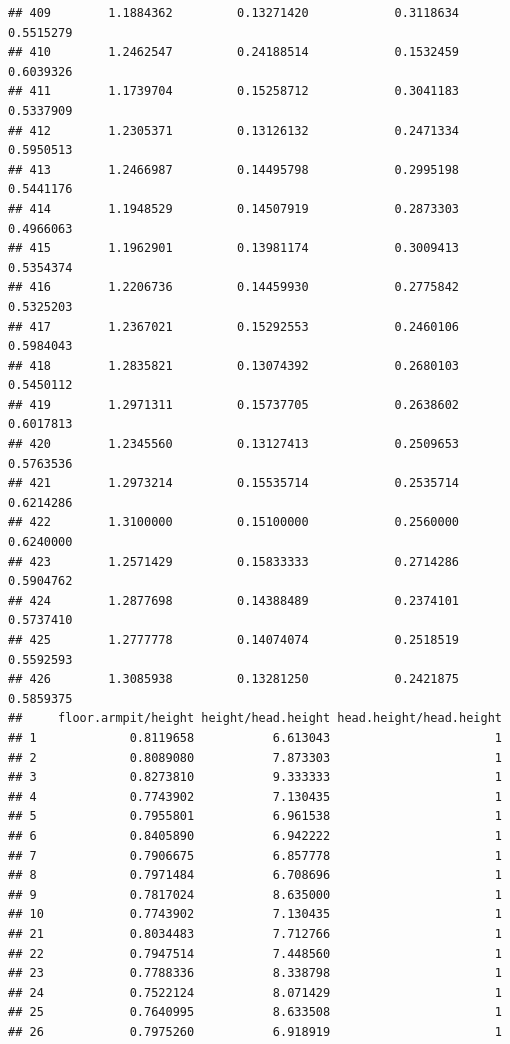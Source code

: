 \documentclass[]{article}
\begin{document}
\begin{verbatim}
## 409        1.1884362         0.13271420            0.3118634        0.5515279
## 410        1.2462547         0.24188514            0.1532459        0.6039326
## 411        1.1739704         0.15258712            0.3041183        0.5337909
## 412        1.2305371         0.13126132            0.2471334        0.5950513
## 413        1.2466987         0.14495798            0.2995198        0.5441176
## 414        1.1948529         0.14507919            0.2873303        0.4966063
## 415        1.1962901         0.13981174            0.3009413        0.5354374
## 416        1.2206736         0.14459930            0.2775842        0.5325203
## 417        1.2367021         0.15292553            0.2460106        0.5984043
## 418        1.2835821         0.13074392            0.2680103        0.5450112
## 419        1.2971311         0.15737705            0.2638602        0.6017813
## 420        1.2345560         0.13127413            0.2509653        0.5763536
## 421        1.2973214         0.15535714            0.2535714        0.6214286
## 422        1.3100000         0.15100000            0.2560000        0.6240000
## 423        1.2571429         0.15833333            0.2714286        0.5904762
## 424        1.2877698         0.14388489            0.2374101        0.5737410
## 425        1.2777778         0.14074074            0.2518519        0.5592593
## 426        1.3085938         0.13281250            0.2421875        0.5859375
##     floor.armpit/height height/head.height head.height/head.height
## 1             0.8119658           6.613043                       1
## 2             0.8089080           7.873303                       1
## 3             0.8273810           9.333333                       1
## 4             0.7743902           7.130435                       1
## 5             0.7955801           6.961538                       1
## 6             0.8405890           6.942222                       1
## 7             0.7906675           6.857778                       1
## 8             0.7971484           6.708696                       1
## 9             0.7817024           8.635000                       1
## 10            0.7743902           7.130435                       1
## 21            0.8034483           7.712766                       1
## 22            0.7947514           7.448560                       1
## 23            0.7788336           8.338798                       1
## 24            0.7522124           8.071429                       1
## 25            0.7640995           8.633508                       1
## 26            0.7975260           6.918919                       1

\end{verbatim}
\end{document}
